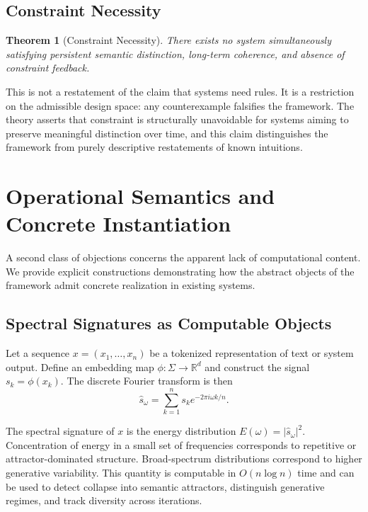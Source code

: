 \documentclass[12pt, a4paper]{article}
\theoremstyle{plain}
\newtheorem{theorem}{Theorem}[section]
\theoremstyle{definition}
\theoremstyle{remark}
\begin{document}
\subsection{Constraint Necessity}

\begin{theorem}[Constraint Necessity]
There exists no system simultaneously satisfying persistent semantic distinction, long-term coherence, and absence of constraint feedback.
\end{theorem}

This is not a restatement of the claim that systems need rules. It is a restriction on the admissible design space: any counterexample falsifies the framework. The theory asserts that constraint is structurally unavoidable for systems aiming to preserve meaningful distinction over time, and this claim distinguishes the framework from purely descriptive restatements of known intuitions.

\section{Operational Semantics and Concrete Instantiation}

A second class of objections concerns the apparent lack of computational content. We provide explicit constructions demonstrating how the abstract objects of the framework admit concrete realization in existing systems.

\subsection{Spectral Signatures as Computable Objects}

Let a sequence $x = (x_1, \dots, x_n)$ be a tokenized representation of text or system output. Define an embedding map $\phi : \Sigma \to \mathbb{R}^d$ and construct the signal $s_k = \phi(x_k)$. The discrete Fourier transform is then
\[
\hat{s}_\omega = \sum_{k=1}^n s_k e^{-2\pi i \omega k / n}.
\]

The spectral signature of $x$ is the energy distribution $E(\omega) = |\hat{s}_\omega|^2$. Concentration of energy in a small set of frequencies corresponds to repetitive or attractor-dominated structure. Broad-spectrum distributions correspond to higher generative variability. This quantity is computable in $O(n \log n)$ time and can be used to detect collapse into semantic attractors, distinguish generative regimes, and track diversity across iterations.
\end{document}
